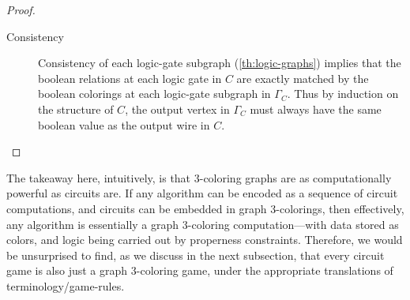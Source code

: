 \begin{proof}
\begin{description}
  \item[Consistency] Consistency of each logic-gate subgraph
    (\cref{th:logic-graphs}) implies that the boolean relations at each logic
    gate in \(C\) are exactly matched by the boolean colorings at each
    logic-gate subgraph in \(Γ_C\).  Thus by induction on the structure of
    \(C\), the output vertex in \(Γ_C\) must always have the same boolean value
    as the output wire in \(C\).  \qedhere

  \end{description}

\end{proof}

The takeaway here, intuitively, is that 3-coloring graphs are as computationally
powerful as circuits are.  If any algorithm can be encoded as a sequence of
circuit computations, and circuits can be embedded in graph 3-colorings, then
effectively, any algorithm is essentially a graph 3-coloring computation—with
data stored as colors, and logic being carried out by properness constraints.
Therefore, we would be unsurprised to find, as we discuss in the next
subsection, that every circuit game is also just a graph 3-coloring game, under
the appropriate translations of terminology/game-rules.


%
%
%
%
%
%
%






